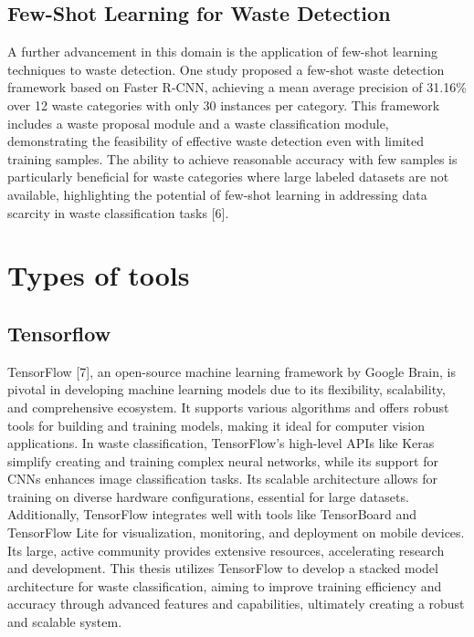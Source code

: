 \subsection{Few-Shot Learning for Waste Detection}
A further advancement in this domain is the application of few-shot learning techniques to waste detection. One study proposed a few-shot waste detection framework based on Faster R-CNN, achieving a mean average precision of 31.16\% over 12 waste categories with only 30 instances per category. This framework includes a waste proposal module and a waste classification module, demonstrating the feasibility of effective waste detection even with limited training samples. The ability to achieve reasonable accuracy with few samples is particularly beneficial for waste categories where large labeled datasets are not available, highlighting the potential of few-shot learning in addressing data scarcity in waste classification tasks [6].

\section{Types of tools}

\subsection{Tensorflow}
TensorFlow [7], an open-source machine learning framework by Google Brain, is pivotal in developing machine learning models due to its flexibility, scalability, and comprehensive ecosystem. It supports various algorithms and offers robust tools for building and training models, making it ideal for computer vision applications. In waste classification, TensorFlow's high-level APIs like Keras simplify creating and training complex neural networks, while its support for CNNs enhances image classification tasks. Its scalable architecture allows for training on diverse hardware configurations, essential for large datasets. Additionally, TensorFlow integrates well with tools like TensorBoard and TensorFlow Lite for visualization, monitoring, and deployment on mobile devices. Its large, active community provides extensive resources, accelerating research and development. This thesis utilizes TensorFlow to develop a stacked model architecture for waste classification, aiming to improve training efficiency and accuracy through advanced features and capabilities, ultimately creating a robust and scalable system.

